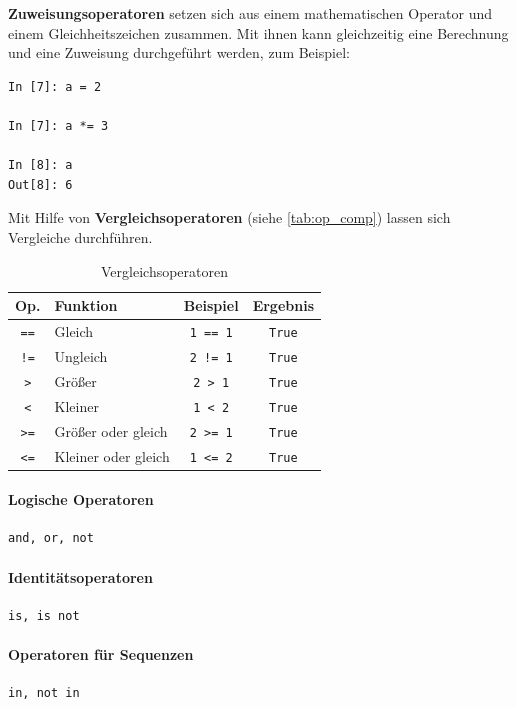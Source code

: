 \textbf{Zuweisungsoperatoren} setzen sich aus einem mathematischen Operator und einem Gleichheitszeichen zusammen.
Mit ihnen kann gleichzeitig eine Berechnung und eine Zuweisung durchgeführt werden, zum Beispiel:
\begin{verbatim}
In [7]: a = 2

In [7]: a *= 3

In [8]: a
Out[8]: 6
\end{verbatim}

Mit Hilfe von \textbf{Vergleichsoperatoren} (siehe \autoref{tab:op_comp}) lassen sich Vergleiche durchführen.
\begin{table}[H]
  \centering{}
  \caption{Vergleichsoperatoren}
  \label{tab:op_comp}
  \begin{tabular}{c l c c}
    \toprule
    Op.             & Funktion            & Beispiel        & Ergebnis \\
    \midrule
    \texttt{==}     & Gleich              & \texttt{1 == 1} & \texttt{True} \\
    \texttt{!=}     & Ungleich            & \texttt{2 != 1} & \texttt{True} \\
    \texttt{>}      & Größer              & \texttt{2 > 1}  & \texttt{True} \\
    \texttt{<}      & Kleiner             & \texttt{1 < 2}  & \texttt{True} \\
    \texttt{>=}     & Größer oder gleich  & \texttt{2 >= 1} & \texttt{True} \\
    \texttt{<=}     & Kleiner oder gleich & \texttt{1 <= 2} & \texttt{True} \\
    \bottomrule
  \end{tabular}
\end{table}

\paragraph{Logische Operatoren}
\begin{verbatim}
and, or, not
\end{verbatim}
\paragraph{Identitätsoperatoren}
\begin{verbatim}
is, is not
\end{verbatim}
\paragraph{Operatoren für Sequenzen}
\begin{verbatim}
in, not in
\end{verbatim}


